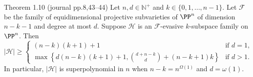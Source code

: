 \begin{result}{Theorem 1.10 (journal pp.8,43--44)}
Let $n,d\in\mathbb N^+$ and $k\in\{0,1,\ldots,n-1\}$. Let $\mathcal F$ be the family of equidimensional projective subvarieties of $\PP^n$ of dimension $n-k-1$ and degree at most $d$. Suppose $\mathcal H$ is an $\mathcal F$-evasive $k$-subspace family on $\PP^n$. Then
\[
|\mathcal H|\ge\begin{cases}
(n-k)(k+1)+1&\text{if }d=1,\\[2pt]
\max\left\{d(n-k)(k+1)+1,\binom{d+n-k}{d}+(n-k+1)k\right\}&\text{if }d>1.
\end{cases}
\]
In particular, $|\mathcal H|$ is superpolynomial in $n$ when $n-k=n^{\Omega(1)}$ and $d=\omega(1)$.
\end{result}
